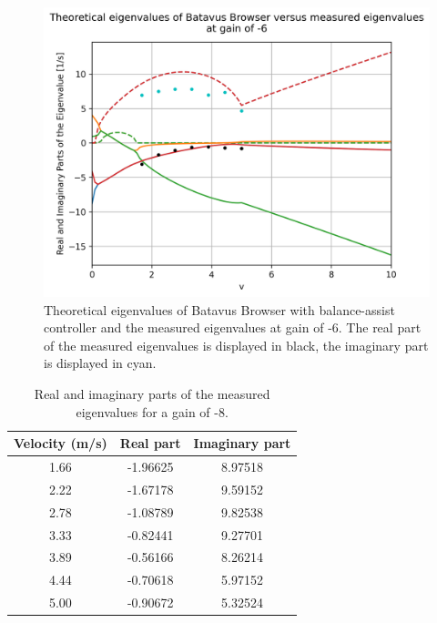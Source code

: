 \documentclass[12pt]{article}
\begin{document}
\begin{figure}
    \centering
    \includegraphics[width=\columnwidth]{figures/gain-6-batavus-without-rider.png}
    \caption{Theoretical eigenvalues of Batavus Browser with balance-assist controller and the measured eigenvalues at gain of -6. The real part of the measured eigenvalues is displayed in black, the imaginary part is displayed  in cyan.}
    \label{gain-6-batavus-without-rider}
\end{figure}


\begin{table}[]
    \centering
    \caption{Real and imaginary parts of the measured eigenvalues for a gain of -8.}
    \label{table-eigenvalues-gain-8}
    \begin{tabular}{c|c|c}
        \textbf{Velocity (m/s)} & \textbf{Real part} & \textbf{Imaginary part} \\ \hline
        1.66                    & -1.96625           & 8.97518                 \\
        2.22                    & -1.67178           & 9.59152                 \\
        2.78                    & -1.08789           & 9.82538                 \\
        3.33                    & -0.82441           & 9.27701                 \\
        3.89                    & -0.56166           & 8.26214                 \\
        4.44                    & -0.70618           & 5.97152                 \\
        5.00                    & -0.90672           & 5.32524                
    \end{tabular}
\end{table}
\end{document}

